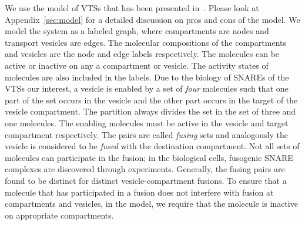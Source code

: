 %

We use the model of VTSs that has been presented
in~\cite{shukla2017discovering}.
%
Please look at Appendix~\ref{sec:model} for a detailed discussion on
pros and cons of the model.
%
We model the system as a labeled graph, where compartments are nodes
and transport vesicles are edges.
%
The molecular compositions of the compartments and vesicles are the
node and edge labels respectively.
%
The molecules can be active or inactive on any a compartment or
vesicle.
%
The activity states of molecules are also included in the labels.
%
Due to the biology of SNAREs of the VTSs our interest, a vesicle is enabled
by a set of {\em four} molecules such that one part of the set occurs in the
vesicle and the other part occurs in the target of the vesicle compartment.
%
The partition always divides the set in the set of three and one molecules.
%
%
%
%
%
The enabling molecules must be active in the vesicle
and target compartment respectively.
%
The pairs are called {\em fusing} sets and analogously
the vesicle is considered to be {\em fused} with the
destination compartment.
%
Not all sets of molecules can participate in the fusion; in the
biological cells, fusogenic SNARE complexes are discovered through
experiments.
%
%
Generally, the fusing pairs are found to be distinct for distinct vesicle-compartment fusions.
%
To ensure that a molecule that has participated in a fusion does not
interfere with fusion at compartments and vesicles, in the model, we
require that the molecule is inactive on appropriate compartments.
